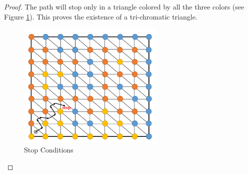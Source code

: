 \documentclass[oneside,solution]{seu-ml-assign}
\begin{document}
\begin{proof}
The path will stop only in a triangle colored by all the three colors
(see Figure \ref{fig:5}). This proves the existence of a tri-chromatic
triangle.
\begin{figure}[H]
\centering
\includegraphics[width=7cm]{Figure/g5.png}
\caption{Stop Conditions}
\label{fig:5}
\end{figure}

\end{proof}
\end{document}
